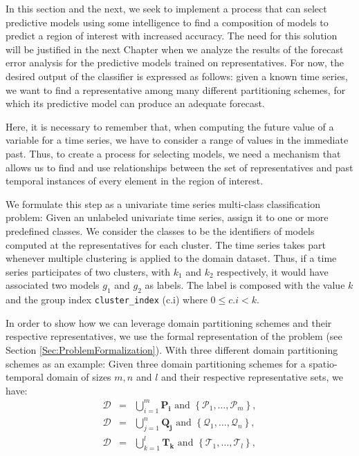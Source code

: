 In this section and the next, we seek to implement a process that can select predictive models using some intelligence to find a composition of models to predict a region of interest with increased accuracy. The need for this solution will be justified in the next Chapter when we analyze the results of the forecast error analysis for the predictive models trained on representatives. For now, the desired output of the classifier is expressed as follows: given a known time series, we want to find a representative among many different partitioning schemes, for which its predictive model can produce an adequate forecast.

Here, it is necessary to remember that, when computing the future value of a variable for a time series, we have to consider a range of values in the immediate past\cite{Chatfield2001}. Thus, to create a process for selecting models, we need a mechanism that allows us to find and use relationships between the set of representatives and past temporal instances of every element in the region of interest.

We formulate this step as a univariate time series multi-class classification problem: Given an unlabeled univariate time series, assign it to one or more predefined classes. We consider the classes to be the identifiers of models computed at the representatives for each cluster. The time series takes part whenever multiple clustering is applied to the domain dataset. Thus, if a time series participates of two clusters, with $k_1$ and $k_2$ respectively, it would have associated two models $g_1$ and $g_2$ as labels. The label is composed with the value $k$ and the group index \texttt{cluster\_index} (c.i) where $0 \leq c.i <k$.

In order to show how we can leverage domain partitioning schemes and their respective representatives, we use the formal representation of the problem (see Section \ref{Sec:ProblemFormalization}). With three different domain partitioning schemes as an example: Given three domain partitioning schemes for a spatio-temporal domain of sizes $m, n$ and $l$ and their respective representative sets, we have:
\begin{eqnarray} 
\nonumber
\mathcal{D}	& = & \bigcup_{i=1}^{m} \mathbf{P_i} \,\,\textrm{and} \,\, \left\{\mathcal{P}_{1}, \ldots, \mathcal{P}_{m}\right\}, \\ \nonumber
\mathcal{D} & = & \bigcup_{j=1}^{n} \mathbf{Q_j} \,\,\textrm{and} \,\, \left\{\mathcal{Q}_{1}, \ldots, \mathcal{Q}_{n}\right\}, \\ \nonumber 
\mathcal{D} & = & \bigcup_{k=1}^{l} \mathbf{T_k} \,\,\textrm{and} \,\, \left\{\mathcal{T}_{1}, \ldots, \mathcal{T}_{l}\right\},
\end{eqnarray}

